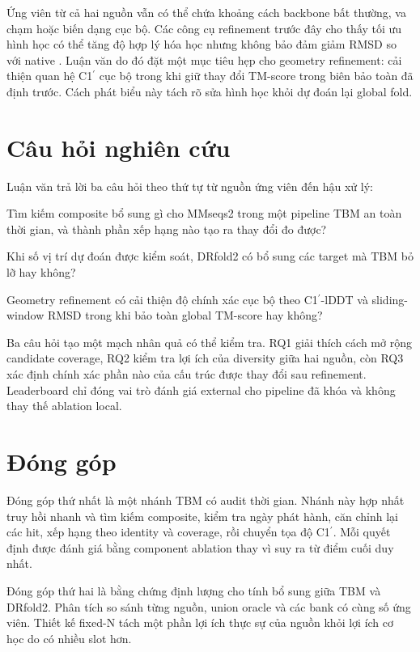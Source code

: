 \documentclass[12pt,a4paper,oneside]{report}
\newcommand{\cprime}{C1$^{\prime}$}
\begin{document}
Ứng viên từ cả hai nguồn vẫn có thể chứa khoảng cách backbone bất thường, va chạm hoặc
biến dạng cục bộ. Các công cụ refinement trước đây cho thấy tối ưu hình học có thể tăng
độ hợp lý hóa học nhưng không bảo đảm giảm RMSD so với native
\cite{qrnas,arena}. Luận văn do đó đặt một mục tiêu hẹp cho geometry refinement: cải
thiện quan hệ \cprime{} cục bộ trong khi giữ thay đổi TM-score trong biên bảo toàn đã
định trước. Cách phát biểu này tách rõ sửa hình học khỏi dự đoán lại global fold.

\section{Câu hỏi nghiên cứu}

Luận văn trả lời ba câu hỏi theo thứ tự từ nguồn ứng viên đến hậu xử lý:

\begin{description}[leftmargin=1.4cm,style=nextline]
  \item[RQ1.] Tìm kiếm composite bổ sung gì cho MMseqs2 trong một pipeline TBM an toàn
  thời gian, và thành phần xếp hạng nào tạo ra thay đổi đo được?
  \item[RQ2.] Khi số vị trí dự đoán được kiểm soát, DRfold2 có bổ sung các target mà
  TBM bỏ lỡ hay không?
  \item[RQ3.] Geometry refinement có cải thiện độ chính xác cục bộ theo
  \cprime{}-lDDT và sliding-window RMSD trong khi bảo toàn global TM-score hay không?
\end{description}

Ba câu hỏi tạo một mạch nhân quả có thể kiểm tra. RQ1 giải thích cách mở rộng candidate
coverage, RQ2 kiểm tra lợi ích của diversity giữa hai nguồn, còn RQ3 xác định chính xác
phần nào của cấu trúc được thay đổi sau refinement. Leaderboard chỉ đóng vai trò đánh
giá external cho pipeline đã khóa và không thay thế ablation local.

\section{Đóng góp}

Đóng góp thứ nhất là một nhánh TBM có audit thời gian. Nhánh này hợp nhất truy hồi nhanh
và tìm kiếm composite, kiểm tra ngày phát hành, căn chỉnh lại các hit, xếp hạng theo
identity và coverage, rồi chuyển tọa độ \cprime{}. Mỗi quyết định được đánh giá bằng
component ablation thay vì suy ra từ điểm cuối duy nhất.

Đóng góp thứ hai là bằng chứng định lượng cho tính bổ sung giữa TBM và DRfold2. Phân tích
so sánh từng nguồn, union oracle và các bank có cùng số ứng viên. Thiết kế fixed-N tách
một phần lợi ích thực sự của nguồn khỏi lợi ích cơ học do có nhiều slot hơn.
\end{document}
